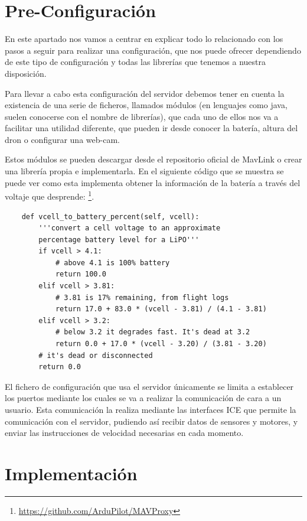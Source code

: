 \section{Pre-Configuración}
\label{Pre-Configuracion}
En este apartado nos vamos a centrar en explicar todo lo relacionado con los pasos a seguir para realizar una configuración, que nos puede ofrecer dependiendo de este tipo de configuración y todas las librerías que tenemos a nuestra disposición.

Para llevar a cabo esta configuración del servidor debemos tener en cuenta la existencia de una serie de ficheros, llamados módulos (en lenguajes como java, suelen conocerse con el nombre de librerías), que cada uno de ellos nos va a facilitar una utilidad diferente, que pueden ir desde conocer la batería, altura del dron o configurar una web-cam.

Estos módulos se pueden descargar desde el repositorio oficial de MavLink o crear una librería propia e implementarla. En el siguiente código que se muestra se puede ver como esta implementa obtener la información de la batería a través del voltaje que desprende:
\footnote{\url{https://github.com/ArduPilot/MAVProxy}}.

{\scriptsize
\begin{verbatim}
    def vcell_to_battery_percent(self, vcell):
        '''convert a cell voltage to an approximate
        percentage battery level for a LiPO'''
        if vcell > 4.1:
            # above 4.1 is 100% battery
            return 100.0
        elif vcell > 3.81:
            # 3.81 is 17% remaining, from flight logs
            return 17.0 + 83.0 * (vcell - 3.81) / (4.1 - 3.81)
        elif vcell > 3.2:
            # below 3.2 it degrades fast. It's dead at 3.2
            return 0.0 + 17.0 * (vcell - 3.20) / (3.81 - 3.20)
        # it's dead or disconnected
        return 0.0
\end{verbatim}}

El fichero de configuración que usa el servidor únicamente se limita a establecer los puertos mediante los cuales se va a realizar la comunicación de cara a un usuario. Esta comunicación la realiza mediante las interfaces ICE que permite la comunicación con el servidor, pudiendo así recibir datos de sensores y motores, y enviar las instrucciones de velocidad necesarias en cada momento.

\section{Implementación}
